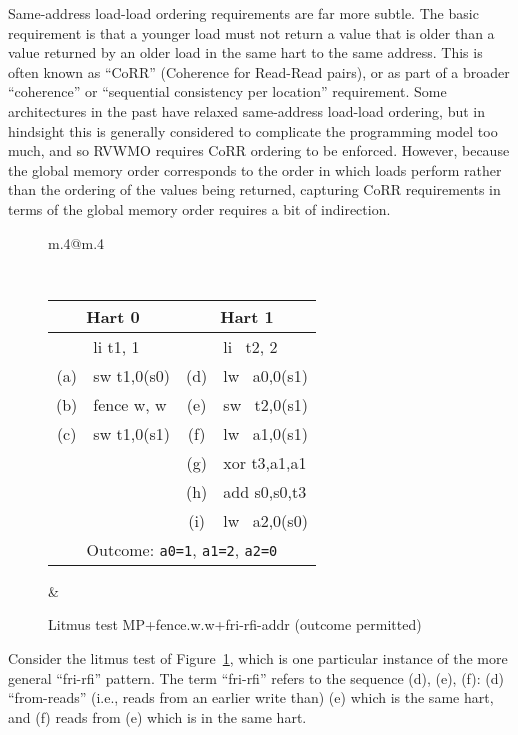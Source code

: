 Same-address load-load ordering requirements are far more subtle.
The basic requirement is that a younger load must not return a value that is older than a value returned by an older load in the same hart to the same address.  This is often known as ``CoRR'' (Coherence for Read-Read pairs), or as part of a broader ``coherence'' or ``sequential consistency per location'' requirement.
Some architectures in the past have relaxed same-address load-load ordering, but in hindsight this is generally considered to complicate the programming model too much, and so RVWMO requires CoRR ordering to be enforced.
However, because the global memory order corresponds to the order in which loads perform rather than the ordering of the values being returned, capturing CoRR requirements in terms of the global memory order requires a bit of indirection.

\begin{figure}[h!]
  \center
  \begin{tabular}{m{.4\linewidth}@{\qquad}m{.4\linewidth}}
    {\tt\small
    \begin{tabular}{cl||cl}
    \multicolumn{2}{c}{Hart 0} & \multicolumn{2}{c}{Hart 1} \\
    \hline
          & li t1, 1    &     & li~ t2, 2    \\
      (a) & sw t1,0(s0) & (d) & lw~ a0,0(s1) \\
      (b) & fence w, w  & (e) & sw~ t2,0(s1) \\
      (c) & sw t1,0(s1) & (f) & lw~ a1,0(s1) \\
          &             & (g) & xor t3,a1,a1 \\
          &             & (h) & add s0,s0,t3 \\
          &             & (i) & lw~ a2,0(s0) \\
      \hline
      \multicolumn{4}{c}{Outcome: {\tt a0=1}, {\tt a1=2}, {\tt a2=0}}
    \end{tabular}
  }
  &
  
  \end{tabular}
  \caption{Litmus test MP+fence.w.w+fri-rfi-addr (outcome permitted)}
  \label{fig:litmus:frirfi}
\end{figure}

Consider the litmus test of Figure~\ref{fig:litmus:frirfi}, which is one particular instance of the more general ``fri-rfi'' pattern.
The term ``fri-rfi'' refers to the sequence (d), (e), (f): (d) ``from-reads'' (i.e., reads from an earlier write than) (e) which is the same hart, and (f) reads from (e) which is in the same hart.

